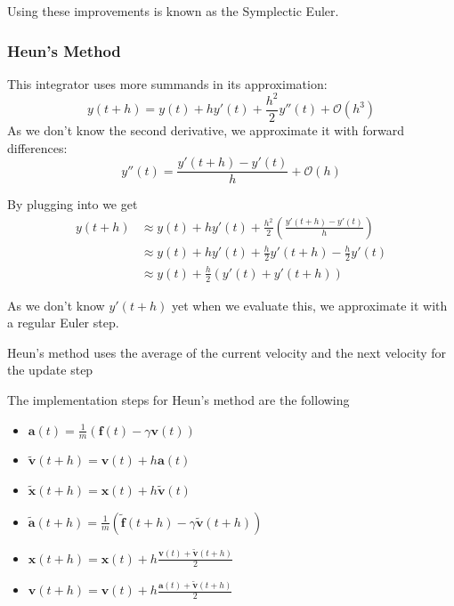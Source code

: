\documentclass{article}
\begin{document}
Using these improvements is known as the Symplectic Euler.

\subsubsection{Heun's Method}
This integrator uses more summands in its approximation:
\begin{equation}
    \label{eq:heun}
    y(t+h) = y(t) + h y'(t) + \frac{h^2}{2}y''(t) + \mathcal{O}(h^3)
\end{equation}
As we don't know the second derivative, we approximate it with forward differences:
\begin{equation}
    \label{eq:second_derivative}
    y''(t) = \frac{y'(t+h) - y'(t)}{h} + \mathcal{O}(h)
\end{equation}

By plugging  into  we get
\begin{align}
    y(t+h)  &\approx y(t) + hy'(t) + \frac{h^2}{2} (\frac{y'(t+h)-y'(t)}{h})\\
            &\approx y(t) + hy'(t) + \frac{h}{2} y'(t+h) - \frac{h}{2} y'(t)\\
            &\approx y(t) + \frac{h}{2}(y'(t) + y'(t+h))
\end{align}

As we don't know $y'(t+h)$ yet when we evaluate this, we approximate it with a regular Euler step.

\begin{keypointbox}
    Heun's method uses the average of the current velocity and the next velocity for the update step
\end{keypointbox}

The implementation steps for Heun's method are the following
\begin{itemize}
    \item $\bm{a}(t) = \frac{1}{m}(\bm{f}(t) - \gamma \bm{v}(t))$
    \item $\bm{\tilde{v}}(t+h) = \bm{v}(t) + h\bm{a}(t)$
    \item $\bm{\tilde{x}}(t+h) = \bm{x}(t) + h\bm{\tilde{v}}(t)$
    \item $\bm{\tilde{a}}(t+h) = \frac{1}{m}(\bm{\tilde{f}}(t+h) - \gamma \bm{\tilde{v}}(t+h))$
    \item $\bm{x}(t+h) = \bm{x}(t) + h \frac{\bm{v}(t) + \bm{\tilde{v}}(t+h)}{2}$
    \item $\bm{v}(t+h) = \bm{v}(t) + h \frac{\bm{a}(t) + \bm{\tilde{v}}(t+h)}{2}$
\end{itemize}
\end{document}
